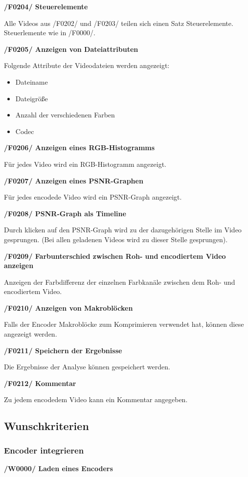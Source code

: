 \documentclass[parskip=full]{scrartcl}
\begin{document}
\textbf{/F0204/ Steuerelemente}

Alle Videos aus /F0202/ und /F0203/ teilen sich einen Satz Steuerelemente. Steuerlemente wie in /F0000/.

\textbf{/F0205/ Anzeigen von Dateiattributen}

Folgende Attribute der Videodateien werden angezeigt:
\begin{itemize}
\item Dateiname
\item Dateigröße
\item Anzahl der verschiedenen Farben
\item Codec
\end{itemize}

\textbf{/F0206/ Anzeigen eines RGB-Histogramms}

Für jedes Video wird ein RGB-Histogramm angezeigt.

\textbf{/F0207/ Anzeigen eines PSNR-Graphen}

Für jedes encodede Video wird ein PSNR-Graph angezeigt.

\textbf{/F0208/ PSNR-Graph als Timeline}

Durch klicken auf den PSNR-Graph wird zu der dazugehörigen Stelle im Video gesprungen. (Bei allen geladenen Videos wird zu dieser Stelle gesprungen).

\textbf{/F0209/ Farbunterschied zwischen Roh- und encodiertem Video anzeigen}

Anzeigen der Farbdifferenz der einzelnen Farbkanäle zwischen dem Roh- und encodiertem Video.

\textbf{/F0210/ Anzeigen von Makroblöcken}

Falls der Encoder Makroblöcke zum Komprimieren verwendet hat, können diese angezeigt werden.

\textbf{/F0211/ Speichern der Ergebnisse}

Die Ergebnisse der Analyse können gespeichert werden.

\textbf{/F0212/ Kommentar}

Zu jedem encodedem Video kann ein Kommentar angegeben.
\subsection{Wunschkriterien}

\subsubsection{Encoder integrieren}
\textbf{/W0000/ Laden eines Encoders}
\end{document}
